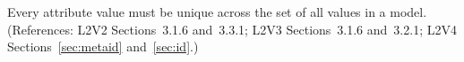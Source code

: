Every  attribute value must be unique across the set of all
 values in a model.  (References: L2V2 Sections~3.1.6 and~3.3.1;
L2V3 Sections~3.1.6 and~3.2.1; L2V4 Sections~\ref{sec:metaid} and~\ref{sec:id}.)
